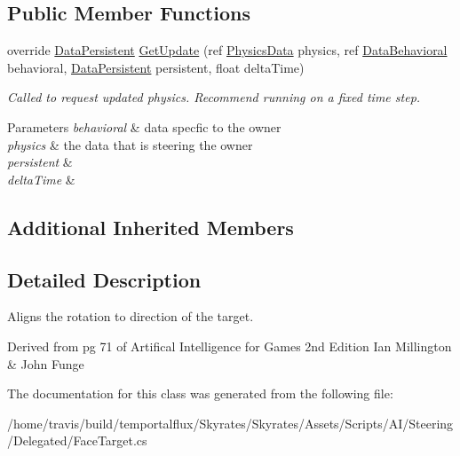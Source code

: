 \subsection*{Public Member Functions}
\begin{DoxyCompactItemize}
\item 
\hypertarget{class_skyrates_1_1_a_i_1_1_steering_1_1_delegated_1_1_face_target_aa8d1f25abf6ed78f81df4ca76092f9fa}{override \hyperlink{class_skyrates_1_1_a_i_1_1_behavior_1_1_data_persistent}{Data\-Persistent} \hyperlink{class_skyrates_1_1_a_i_1_1_steering_1_1_delegated_1_1_face_target_aa8d1f25abf6ed78f81df4ca76092f9fa}{Get\-Update} (ref \hyperlink{class_skyrates_1_1_physics_1_1_physics_data}{Physics\-Data} physics, ref \hyperlink{class_skyrates_1_1_a_i_1_1_behavior_1_1_data_behavioral}{Data\-Behavioral} behavioral, \hyperlink{class_skyrates_1_1_a_i_1_1_behavior_1_1_data_persistent}{Data\-Persistent} persistent, float delta\-Time)}\label{class_skyrates_1_1_a_i_1_1_steering_1_1_delegated_1_1_face_target_aa8d1f25abf6ed78f81df4ca76092f9fa}

\begin{DoxyCompactList}\small\item\em Called to request updated physics. Recommend running on a fixed time step. 


\begin{DoxyParams}{Parameters}
{\em behavioral} & data specfic to the owner\\
\hline
{\em physics} & the data that is steering the owner\\
\hline
{\em persistent} & \\
\hline
{\em delta\-Time} & \\
\hline
\end{DoxyParams}
 \end{DoxyCompactList}\end{DoxyCompactItemize}
\subsection*{Additional Inherited Members}


\subsection{Detailed Description}
Aligns the rotation to direction of the target. 

Derived from pg 71 of Artifical Intelligence for Games 2nd Edition Ian Millington \& John Funge 

The documentation for this class was generated from the following file\-:\begin{DoxyCompactItemize}
\item 
/home/travis/build/temportalflux/\-Skyrates/\-Skyrates/\-Assets/\-Scripts/\-A\-I/\-Steering/\-Delegated/Face\-Target.\-cs\end{DoxyCompactItemize}
